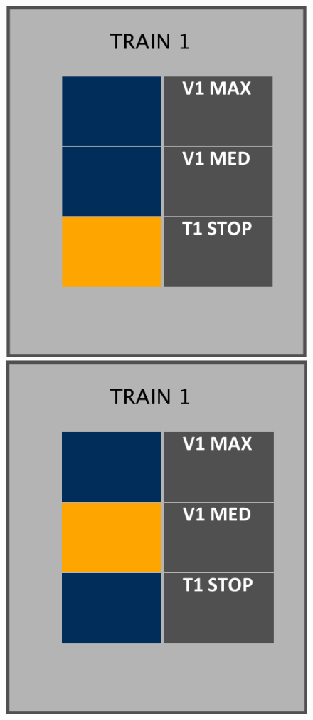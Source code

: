 \documentclass[a4paper,12pt]{article}
\begin{document}
\begin{figure}[htp]
    \centering
    \begin{minipage}{0.3\textwidth}
        \centering
        \includegraphics[width=0.9\linewidth]{images/tn_gui_1.png}
    \end{minipage}\hfill
    \begin{minipage}{0.3\textwidth}
        \centering
        \includegraphics[width=0.9\linewidth]{images/tn_gui_2.png}

\end{minipage}
\end{figure}
\end{document}
